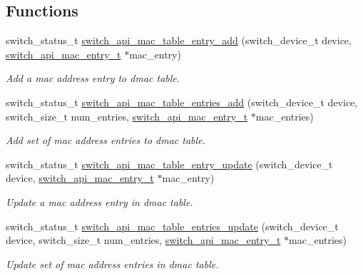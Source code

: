 \subsection*{Functions}
\begin{DoxyCompactItemize}
\item 
switch\+\_\+status\+\_\+t \hyperlink{group__L2_ga106154dbf2c93887a5bc2d44e105d856}{switch\+\_\+api\+\_\+mac\+\_\+table\+\_\+entry\+\_\+add} (switch\+\_\+device\+\_\+t device, \hyperlink{group__L2_ga2fde8bafec6b710770603b5cde2f94af}{switch\+\_\+api\+\_\+mac\+\_\+entry\+\_\+t} $\ast$mac\+\_\+entry)
\begin{DoxyCompactList}\small\item\em Add a mac address entry to dmac table. \end{DoxyCompactList}\item 
switch\+\_\+status\+\_\+t \hyperlink{group__L2_gadeb87de7788e245fcab5bac934b2c3a3}{switch\+\_\+api\+\_\+mac\+\_\+table\+\_\+entries\+\_\+add} (switch\+\_\+device\+\_\+t device, switch\+\_\+size\+\_\+t num\+\_\+entries, \hyperlink{group__L2_ga2fde8bafec6b710770603b5cde2f94af}{switch\+\_\+api\+\_\+mac\+\_\+entry\+\_\+t} $\ast$mac\+\_\+entries)
\begin{DoxyCompactList}\small\item\em Add set of mac address entries to dmac table. \end{DoxyCompactList}\item 
switch\+\_\+status\+\_\+t \hyperlink{group__L2_gaa1f1e2de37135465b532dab1e4df76a0}{switch\+\_\+api\+\_\+mac\+\_\+table\+\_\+entry\+\_\+update} (switch\+\_\+device\+\_\+t device, \hyperlink{group__L2_ga2fde8bafec6b710770603b5cde2f94af}{switch\+\_\+api\+\_\+mac\+\_\+entry\+\_\+t} $\ast$mac\+\_\+entry)
\begin{DoxyCompactList}\small\item\em Update a mac address entry in dmac table. \end{DoxyCompactList}\item 
switch\+\_\+status\+\_\+t \hyperlink{group__L2_gaf95e0ac6c2f5e79ca6da65d9f18de9f2}{switch\+\_\+api\+\_\+mac\+\_\+table\+\_\+entries\+\_\+update} (switch\+\_\+device\+\_\+t device, switch\+\_\+size\+\_\+t num\+\_\+entries, \hyperlink{group__L2_ga2fde8bafec6b710770603b5cde2f94af}{switch\+\_\+api\+\_\+mac\+\_\+entry\+\_\+t} $\ast$mac\+\_\+entries)
\begin{DoxyCompactList}\small\item\em Update set of mac address entries in dmac table. \end{DoxyCompactList}\item 

\end{DoxyCompactItemize}
